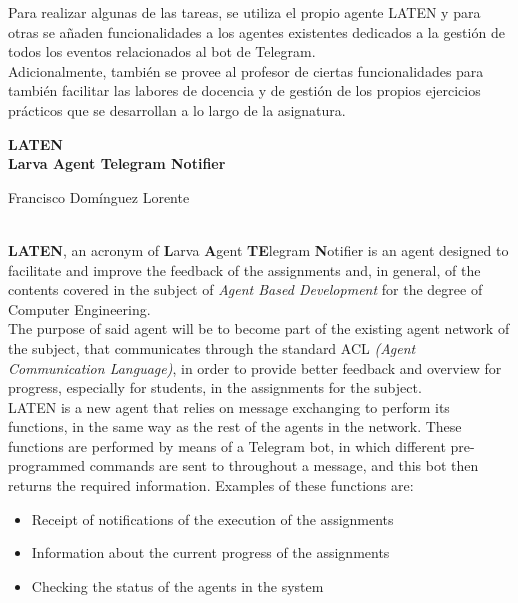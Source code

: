 	Para realizar algunas de las tareas, se utiliza el propio agente LATEN y para otras se añaden funcionalidades a los agentes existentes dedicados a la gestión de todos los eventos
	relacionados al bot de Telegram.\\

	Adicionalmente, también se provee al profesor de ciertas funcionalidades para también facilitar las labores de docencia y de gestión de los propios ejercicios prácticos que
	se desarrollan a lo largo de la asignatura.

\cleardoublepage

\begin{center}
	{\large\bfseries LATEN \\ Larva Agent Telegram Notifier }\\
\end{center}
\begin{center}
	Francisco Domínguez Lorente\\
\end{center}
\vspace{0.5cm}
\vspace{0.7cm}

\\
    \textbf{LATEN}, an acronym of \textbf{L}arva \textbf{A}gent \textbf{TE}legram \textbf{N}otifier is an agent designed to facilitate and improve the feedback of the assignments and, in general, of the contents covered in the subject of \textit{Agent Based Development} for the degree of Computer Engineering.\\
    
    The purpose of said agent will be to become part of the existing agent network of the subject, that communicates through the standard ACL \textit{(Agent Communication Language)}, in order to provide better feedback and overview for progress, especially for students, in the assignments for the subject.\\
    
    LATEN is a new agent that relies on message exchanging to perform its functions, in the same way as the rest of the agents in the network. These functions are performed by means of a Telegram bot, in which different pre-programmed commands are sent to throughout a message, and this bot then returns the required information. Examples of these functions are:
    
    \begin{itemize}
		\item Receipt of notifications of the execution of the assignments
		\item Information about the current progress of the assignments
		\item Checking the status of the agents in the system
	\end{itemize}
	
